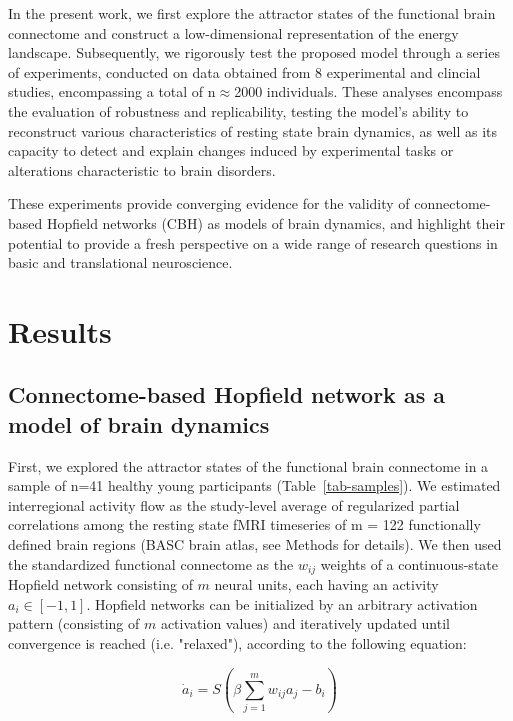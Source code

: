 \documentclass{article}
\begin{document}
In the present work, we first explore the attractor states of the functional brain connectome and construct a
low-dimensional representation of the energy landscape.
Subsequently, we rigorously test the proposed model through a series of experiments, conducted on data obtained
from 8 experimental and clincial studies, encompassing a total of n$\approx$2000 individuals.
These analyses encompass the evaluation of robustness and replicability, testing the model's ability to reconstruct
various characteristics of resting state brain dynamics, as well as its capacity to detect and explain changes induced
by experimental tasks or alterations characteristic to brain disorders.

These experiments provide converging evidence for the validity of connectome-based Hopfield networks (CBH) as models
of brain dynamics, and highlight their potential to provide a fresh perspective on a wide range of research questions
in basic and translational neuroscience.

\section{Results}\label{Results}

\subsection{Connectome-based Hopfield network as a model of brain dynamics}\label{Connectome-based Hopfield network as a model of brain dynamics}

First, we explored the attractor states of the functional brain connectome in a sample of n=41 healthy young
participants (Table~\ref{tab-samples}). We estimated interregional activity flow \citep{cole2016activity, ito2017cognitive}
as the study-level average of regularized partial correlations among the resting state fMRI timeseries of m = 122
functionally defined brain regions (BASC brain atlas, see Methods for details). We then used the standardized
functional connectome as the $w_{ij}$  weights of a continuous-state Hopfield network
\citep{hopfield1982neural, koiran1994dynamics} consisting of $m$ neural units, each having an activity
$a_i \in [ -1,1]$. Hopfield networks can be initialized by an arbitrary activation pattern (consisting of
$m$ activation values) and iteratively updated until convergence is reached (i.e. "relaxed"), according to the
following equation:

\begin{equation}
\label{hopfield-update}
\dot{a}_i = S(\beta \sum_{j=1}^m w_{ij}a_j - b_i)
\end{equation}
\end{document}
